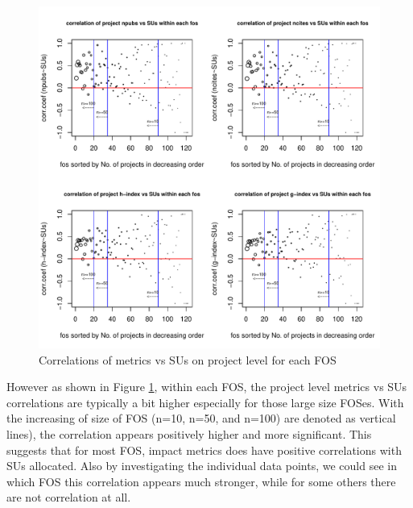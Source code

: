 \begin{figure}[htb]
  \centering
    \includegraphics[width=1.0\columnwidth]{images/06_corr_metrics_vs_alloc_proj_by_fos.pdf}
  \caption{Correlations of metrics vs SUs on project level for each FOS}\label{F:corr-metrics-vs-alloc-proj-by-fos}
\end{figure}

However as shown in Figure \ref{F:corr-metrics-vs-alloc-proj-by-fos}, within each FOS, the project level metrics vs SUs correlations are typically a bit higher especially for those large size FOSes. With the increasing of size of FOS (n=10, n=50, and n=100) are denoted as vertical lines), the correlation appears positively higher and more significant. This suggests that for most FOS, impact metrics does have positive correlations with SUs allocated. Also by investigating the individual data points, we could see in which FOS this correlation appears much stronger, while for some others there are not correlation at all.



